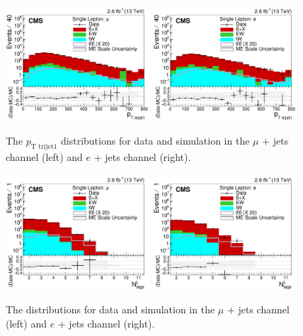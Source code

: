     
\begin{figure}[ht!]
    \includegraphics[width=0.48\textwidth]{images/Run2/bestTopPt_StackLogY.pdf}
    \includegraphics[width=0.48\textwidth]{images/Run2/bestTopPt_StackLogY_e.pdf}
    \caption{The $p_{\textrm{T trijet1}}$ distributions for data and simulation in the $\mu$ + jets channel (left) and $e$ + jets channel (right).}
    \label{fig:bestTopPt}
\end{figure}
   

\begin{figure}[ht!]
    \includegraphics[width=0.48\textwidth]{images/Run2/nLtags_StackLogY.pdf}
    \includegraphics[width=0.48\textwidth]{images/Run2/nLtags_StackLogY_e.pdf}
    \caption{The \nLtags distributions for data and simulation in the $\mu$ + jets channel (left) and $e$ + jets channel (right).}
    \label{fig:nLtagsInc}
\end{figure}

